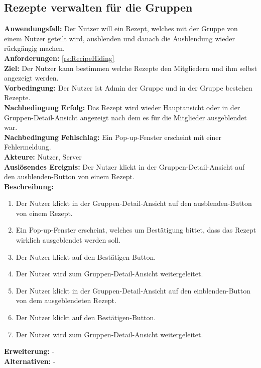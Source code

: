 \documentclass[parskip=full]{scrartcl}
\begin{document}
\subsection{Rezepte verwalten für die Gruppen}
\textbf{Anwendungsfall:} Der Nutzer will ein Rezept, welches mit der Gruppe von einem Nutzer geteilt wird, ausblenden und danach die Ausblendung wieder rückgängig machen.\\
\textbf{Anforderungen:} \ref{rs:RecipeHiding}\\
\textbf{Ziel:} Der Nutzer kann bestimmen welche Rezepte den Mitgliedern und ihm selbst angezeigt werden.\\
\textbf{Vorbedingung:} Der Nutzer ist Admin der Gruppe und in der Gruppe bestehen Rezepte.\\
\textbf{Nachbedingung Erfolg:} Das Rezept wird wieder Hauptansicht oder in der Gruppen-Detail-Ansicht angezeigt nach dem es für die Mitglieder  ausgeblendet war.\\
\textbf{Nachbedingung Fehlschlag:} Ein Pop-up-Fenster erscheint mit einer Fehlermeldung.\\
\textbf{Akteure:} Nutzer, Server \\
\textbf{Auslösendes Ereignis:} Der Nutzer klickt in der Gruppen-Detail-Ansicht auf den ausblenden-Button von einem Rezept.\\
\textbf{Beschreibung:}
\begin{enumerate}
    \item Der Nutzer klickt in der Gruppen-Detail-Ansicht auf den ausblenden-Button von einem Rezept.
    \item Ein Pop-up-Fenster erscheint, welches um Bestätigung bittet, dass das Rezept wirklich ausgeblendet werden soll.
    \item Der Nutzer klickt auf den Bestätigen-Button.
    \item Der Nutzer wird zum Gruppen-Detail-Ansicht weitergeleitet.
    \item Der Nutzer klickt in der Gruppen-Detail-Ansicht auf den einblenden-Button von dem ausgeblendeten Rezept.
    \item Der Nutzer klickt auf den Bestätigen-Button.
    \item Der Nutzer wird zum Gruppen-Detail-Ansicht weitergeleitet.
\end{enumerate}
\textbf{Erweiterung:} -\\
\textbf{Alternativen:} -
\newpage
\end{document}
